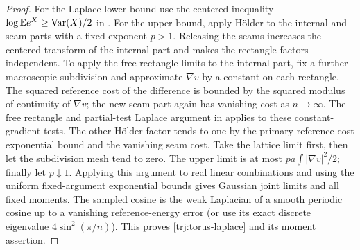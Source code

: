 \begin{proof}
For the Laplace lower bound use the centered inequality
\(\log\mathbb E e^X\ge\operatorname{Var}(X)/2\) in \cite[Lemma~2.2]{C}.  For the upper
bound, apply H\"older to the internal and seam parts with a fixed
exponent \(p>1\).  Releasing the seams increases the centered transform
of the internal part and makes the rectangle factors independent.
To apply the free rectangle limits to the internal part, fix a further
macroscopic subdivision and approximate \(\nabla v\) by a constant on
each rectangle.  The squared reference cost of the difference is
bounded by the squared modulus of continuity of \(\nabla v\); the new
seam part again has vanishing cost as \(n\to\infty\).  The free
rectangle and partial-test Laplace argument in \cite[Theorem~2.4]{C}
applies to these constant-gradient tests.  The other H\"older factor
tends to one by the primary reference-cost exponential bound and the
vanishing seam cost.  Take the lattice limit first, then let the
subdivision mesh tend to zero.  The upper limit is at most
\(pa\int|\nabla v|^2/2\); finally let \(p\downarrow1\).  Applying this argument
to real linear combinations and using the uniform fixed-argument
exponential bounds gives Gaussian joint limits and all fixed moments.
The sampled cosine is the weak Laplacian of a smooth periodic cosine
up to a vanishing reference-energy error (or use its exact discrete
eigenvalue \(4\sin^2(\pi/n)\)).  This proves
\eqref{trj:torus-laplace} and its moment assertion.


\end{proof}
